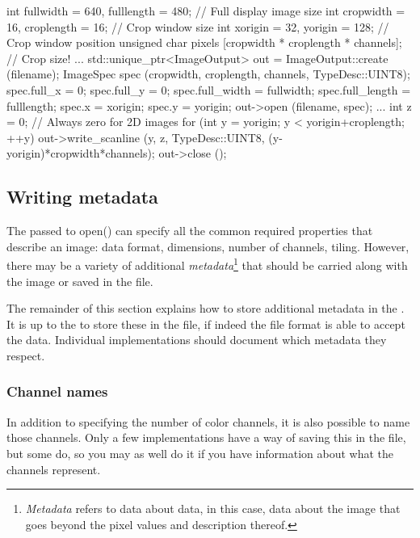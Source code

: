 \begin{code}
        int fullwidth = 640, fulllength = 480; // Full display image size
        int cropwidth = 16, croplength = 16;  // Crop window size
        int xorigin = 32, yorigin = 128;      // Crop window position
        unsigned char pixels [cropwidth * croplength * channels]; // Crop size!
        ...
        std::unique_ptr<ImageOutput> out = ImageOutput::create (filename);
        ImageSpec spec (cropwidth, croplength, channels, TypeDesc::UINT8);
        spec.full_x = 0;
        spec.full_y = 0;
        spec.full_width = fullwidth;
        spec.full_length = fulllength;
        spec.x = xorigin;
        spec.y = yorigin;
        out->open (filename, spec);
        ...
        int z = 0;   // Always zero for 2D images
        for (int y = yorigin;  y < yorigin+croplength;  ++y) {
            out->write_scanline (y, z, TypeDesc::UINT8,
                                 (y-yorigin)*cropwidth*channels);
        }
        out->close ();
\end{code}


\subsection{Writing metadata}
\label{sec:imageoutput:metadata}

The \ImageSpec passed to {\cf open()} can specify all the common
required properties that describe an image: data format, dimensions,
number of channels, tiling.  However, there may be a variety of
additional \emph{metadata}\footnote{\emph{Metadata} refers to data about
data, in this case, data about the image that goes beyond the pixel
values and description thereof.} that should be carried along with the
image or saved in the file.  

The remainder of this section explains how to store additional metadata
in the \ImageSpec.  It is up to the \ImageOutput to store these
in the file, if indeed the file format is able to accept the data.
Individual \ImageOutput implementations should document which metadata
they respect.

\subsubsection{Channel names}

In addition to specifying the number of color channels, it is also
possible to name those channels.  Only a few \ImageOutput
implementations have a way of saving this in the file, but some do, so
you may as well do it if you have information about what the channels
represent.

